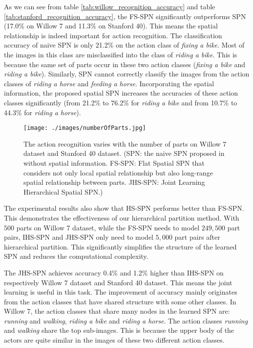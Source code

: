 \documentclass[journal]{IEEEtran}
\begin{document}
As we can see from table \ref{tab:willow_recognition_accuracy} and table \ref{tab:stanford_recognition_accuracy}, the FS-SPN significantly outperforms SPN (17.0\% on Willow 7 and 11.3\% on Stanford 40). This means the spatial relationship is indeed important for action recognition. The classification accuracy of naive SPN is only 21.2\% on the action class of \textit{fixing a bike}. Most of the images in this class are misclassified into the class of \textit{riding a bike}. This is because the same set of parts occur in these two action classes (\textit{fixing a bike} and \textit{riding a bike}). Similarly, SPN cannot correctly classify the images from the action classes of \textit{riding a horse} and \textit{feeding a horse}. Incorporating the spatial information, the proposed spatial SPN increases the accuracies of these action classes significantly (from 21.2\% to 76.2\% for \textit{riding a bike} and from 10.7\% to 44.3\% for \textit{riding a horse}).




\begin{figure}[htb]
	\begin{center}
		\texttt{[image: ./images/numberOfParts.jpg]}
	\end{center}
	\caption{The action recognition varies with the number of parts on Willow 7 dataset and Stanford 40 dataset. (SPN: the naive SPN proposed in \cite{poon2011SPNIntroduce} without spatial information. FS-SPN: Flat Spatial SPN that considers not only local spatial relationship but also long-range spatial relationship between parts. JHS-SPN: Joint Learning Hierarchical Spatial SPN.)}
	\label{fig:AccNumberofParts}
\end{figure}





The experimental results also show that HS-SPN performs better than FS-SPN. This demonstrates the effectiveness of our hierarchical partition method. With $ 500 $ parts on Willow 7 dataset, while the FS-SPN needs to model $ 249,500 $ part pairs, IHS-SPN and JHS-SPN only need to model $ 5,000 $ part pairs after hierarchical partition. This significantly simplifies the structure of the learned SPN and reduces the computational complexity.





The JHS-SPN achieves accuracy 0.4\% and 1.2\% higher than IHS-SPN on respectively Willow 7 dataset and Stanford 40 dataset. This means the joint learning is useful in this task. The improvement of accuracy mainly originates from the action classes that have shared structure with some other classes. In Willow 7, the action classes that share many nodes in the learned SPN are: \textit{running} and \textit{walking}, \textit{riding a bike} and \textit{riding a horse}. The action classes \textit{running} and \textit{walking} share the top sub-images. This is because the upper body of the actors are quite similar in the images of these two different action classes.
\end{document}
